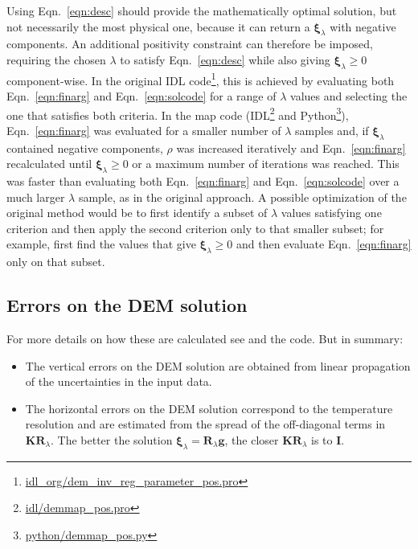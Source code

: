 \documentclass[12pt,a4paper]{article}
\begin{document}
Using Eqn.~\ref{eqn:desc} should provide the mathematically optimal solution, but not necessarily the most physical one, because it can return a $\boldsymbol{\xi}_\lambda$ with negative components. An additional positivity constraint can therefore be imposed, requiring the chosen $\lambda$ to satisfy Eqn.~\ref{eqn:desc} while also giving $\boldsymbol{\xi}_\lambda \ge 0$ component-wise. In the original IDL code\footnote{\href{https://github.com/ianan/demreg/blob/master/idl_org/dem_inv_reg_parameter_pos.pro}{idl\_org/dem\_inv\_reg\_parameter\_pos.pro}}, this is achieved by evaluating both Eqn.~\ref{eqn:finarg} and Eqn.~\ref{eqn:solcode} for a range of $\lambda$ values and selecting the one that satisfies both criteria. In the map code (IDL\footnote{\href{https://github.com/ianan/demreg/blob/master/idl/demmap_pos.pro}{idl/demmap\_pos.pro}} and Python\footnote{\href{https://github.com/ianan/demreg/blob/master/python/demmap_pos.py}{python/demmap\_pos.py}}), Eqn.~\ref{eqn:finarg} was evaluated for a smaller number of $\lambda$ samples and, if $\boldsymbol{\xi}_\lambda$ contained negative components, $\rho$ was increased iteratively and Eqn.~\ref{eqn:finarg} recalculated until $\boldsymbol{\xi}_\lambda \ge 0$ or a maximum number of iterations was reached. This was faster than evaluating both Eqn.~\ref{eqn:finarg} and Eqn.~\ref{eqn:solcode} over a much larger $\lambda$ sample, as in the original approach. A possible optimization of the original method would be to first identify a subset of $\lambda$ values satisfying one criterion and then apply the second criterion only to that smaller subset; for example, first find the values that give $\boldsymbol{\xi}_\lambda \ge 0$ and then evaluate Eqn.~\ref{eqn:finarg} only on that subset.

\subsection*{Errors on the DEM solution}

For more details on how these are calculated see \citet{2012A&A...539A.146H,2013A&A...553A..10H} and the code. But in summary:
\begin{itemize}
	\item The vertical errors on the DEM solution are obtained from linear propagation of the uncertainties in the input data.
	\item The horizontal errors on the DEM solution correspond to the temperature resolution and are estimated from the spread of the off-diagonal terms in $\mathbf{K}\mathbf{R}_\lambda$. The better the solution $\boldsymbol{\xi}_\lambda = \mathbf{R}_\lambda\mathbf{g}$, the closer $\mathbf{K}\mathbf{R}_\lambda$ is to $\mathbf{I}$.
\end{itemize}
\end{document}
